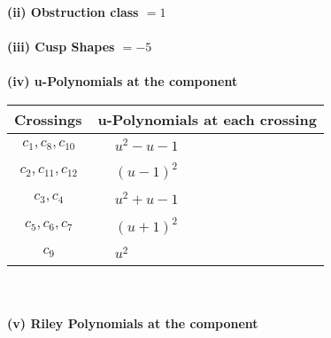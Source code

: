 \documentclass[1p]{elsarticle_modified}
\theoremstyle{definition}
\begin{document}
\flushleft \textbf{(ii) Obstruction class $= 1$}\\~\\
\flushleft \textbf{(iii) Cusp Shapes $= -5$}\\~\\
\newpage\renewcommand{\arraystretch}{1}
\flushleft \textbf{(iv) u-Polynomials at the component}\newline \\
\begin{tabular}{m{50pt}|m{274pt}}
Crossings & \hspace{64pt}u-Polynomials at each crossing \\
\hline $$\begin{aligned}c_{1},c_{8},c_{10}\end{aligned}$$&$\begin{aligned}
&u^2- u-1
\end{aligned}$\\
\hline $$\begin{aligned}c_{2},c_{11},c_{12}\end{aligned}$$&$\begin{aligned}
&(u-1)^2
\end{aligned}$\\
\hline $$\begin{aligned}c_{3},c_{4}\end{aligned}$$&$\begin{aligned}
&u^2+u-1
\end{aligned}$\\
\hline $$\begin{aligned}c_{5},c_{6},c_{7}\end{aligned}$$&$\begin{aligned}
&(u+1)^2
\end{aligned}$\\
\hline $$\begin{aligned}c_{9}\end{aligned}$$&$\begin{aligned}
&u^2
\end{aligned}$\\
\hline
\end{tabular}\\~\\
\newpage\renewcommand{\arraystretch}{1}
\flushleft \textbf{(v) Riley Polynomials at the component}\newline \\
\end{document}
